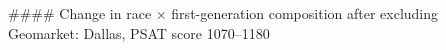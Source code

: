 #### Change in race × first-generation composition after excluding Geomarket: Dallas, PSAT score 1070–1180
